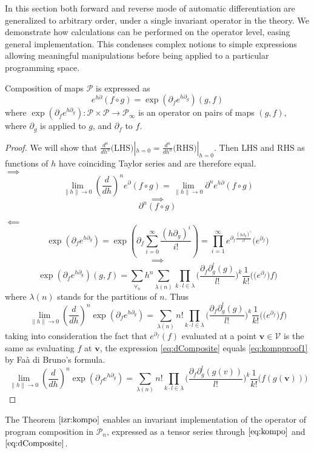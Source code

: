 \documentclass[smallcondensed]{svjour3}
\newcommand{\VV}{\mathcal{V}}
\newcommand{\vv}{\mathbf{v}}
\newcommand{\dP}{\mathcal{P}}
\newcommand{\D}{\partial}
\begin{document}
 In this section both forward \cite{PcAD} and reverse \cite{ReverseAD} mode of automatic differentiation are generalized to arbitrary order, under a single invariant operator in the theory. We demonstrate how calculations can be performed on the operator level, easing general implementation. This condenses complex notions to simple expressions allowing meaningful manipulations before being applied to a particular programming space.
 
 \begin{theorem}\label{izr:kompo}
 Composition of maps $\dP$ is expressed as
 \begin{equation}\label{eq:kompo}
 e^{h\D}(f\circ g)=\exp(\D_fe^{h\D_g})(g,f)
 \end{equation}
 where $\exp(\D_fe^{h\D_g}):\dP\times\dP\to\dP_\infty$ is an operator on pairs of maps $(g,f)$, where $\D_g$ is applied to $g$, and $\D_f$ to $f$. 
 \end{theorem}
 
\begin{proof}
  We will show that $\frac{d^n}{dh^n}\text{(LHS)}|_{h=0}=\frac{d^n}{dh^n}\text{(RHS)}|_{h=0}$. Then $\text{LHS}$ and $\text{RHS}$ as functions
  of $h$ have coinciding Taylor series and are therefore equal.\\
 $\implies$
 $$\lim\limits_{\lVert h\rVert\to 0}(\frac{d}{dh})^ne^\D(f\circ g)=\lim\limits_{\lVert h\rVert\to 0}\D^ne^{h\D}(f\circ g)$$
 $$\implies$$
 \begin{equation}\label{eq:kompproof1}
 \D^n(f\circ g)
 \end{equation}
 
 $\impliedby$
 $$\exp(\D_fe^{h\D_g})=\exp\left(\D_f\sum\limits_{i=0}^{\infty}\frac{(h\D_g)^i}{i!}\right)=\prod_{i=1}^{\infty}e^{\D_f\frac{(h\D_g)^i}{i!}}\Big(e^{\D_f}\Big)$$
 $$\implies$$
 $$\exp(\D_fe^{h\D_g})(g,f)=\sum\limits_{\forall_n}h^n\sum\limits_{\lambda(n)}\prod\limits_{k\cdot l\in\lambda}\Big(\frac{\D_f\D_g^l(g)}{l!}\Big)^k\frac{1}{k!}\Big(\Big(e^{\D_f}\Big)f\Big)$$
 where $\lambda(n)$ stands for the partitions of $n$. Thus
 \begin{equation}\label{eq:dComposite}
 \lim\limits_{\lVert h\rVert\to 0}(\frac{d}{dh})^n\exp(\D_fe^{h\D_g})=\sum\limits_{\lambda(n)}n!\prod\limits_{k\cdot l\in\lambda}\Big(\frac{\D_f\D_g^l(g)}{l!}\Big)^k\frac{1}{k!}\Big(\Big(e^{\D_f}\Big)f\Big)
 \end{equation}
 taking into consideration the fact that $e^{\D_f}(f)$ evaluated at a point $\vv\in \VV$ is the same as evaluating $f$ at $\vv$, the expression \eqref{eq:dComposite} equals \eqref{eq:kompproof1} by Faà di Bruno's formula.
   \begin{equation}\label{eq:dCompositePoint}
   \lim\limits_{\lVert h\rVert\to 0}(\frac{d}{dh})^n\exp(\D_fe^{h\D_g})=\sum\limits_{\lambda(n)}n!\prod\limits_{k\cdot l\in\lambda}\Big(\frac{\D_f\D_g^l(g(v))}{l!}\Big)^k\frac{1}{k!}\Big(f(g(\vv))\Big)
   \end{equation}
 \end{proof}       
 The Theorem $\ref{izr:kompo}$ enables an invariant implementation of the operator of program composition in $\dP_n$, expressed as a tensor series through $\eqref{eq:kompo}$ and $\eqref{eq:dComposite}$. 
 
\end{document}

